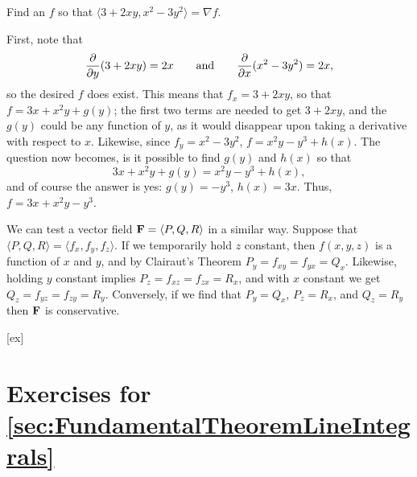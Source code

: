\begin{example}{}{}
Find an $f$ so that $\langle 3+2xy,x^2-3y^2\rangle = \nabla f$.
\end{example}
\begin{solution}
First, note that 
$${\partial\over\partial y}(3+2xy)=2x\qquad\hbox{and}\qquad
{\partial\over\partial x}(x^2-3y^2)=2x,$$
so the desired $f$ does exist. This means that $f_x=3+2xy$, so that
$f=3x+x^2y+g(y)$; the first two terms are needed to get $3+2xy$, and
the $g(y)$ could be any function of $y$, as it would disappear upon
taking a derivative with respect to $x$. Likewise, since
$f_y=x^2-3y^2$, $f=x^2y-y^3+h(x)$. The question now becomes, is it
possible to find $g(y)$ and $h(x)$ so that
$$3x+x^2y+g(y)=x^2y-y^3+h(x),$$
and of course the answer is yes: $g(y)=-y^3$, $h(x)=3x$. Thus,
$f=3x+x^2y-y^3$.
\end{solution}

\label{page:test for conservative vector field}
We can test a vector field ${\bf F}=\langle P,Q,R\rangle$ in a similar
way. Suppose that $\langle P,Q,R\rangle=\langle f_x,f_y,f_z\rangle$. If we temporarily hold
$z$ constant, then $f(x,y,z)$ is a function of $x$ and $y$, and
by Clairaut's Theorem $P_y=f_{xy}=f_{yx}=Q_x$.
Likewise, holding $y$ constant implies $P_z=f_{xz}=f_{zx}=R_x$, and
with $x$ constant we get $Q_z=f_{yz}=f_{zy}=R_y$. Conversely, if we
find that $P_y=Q_x$, $P_z=R_x$, and $Q_z=R_y$ then $\bf F$ is
conservative.


[ex]
\section*{Exercises for \ref{sec:FundamentalTheoremLineIntegrals}}

